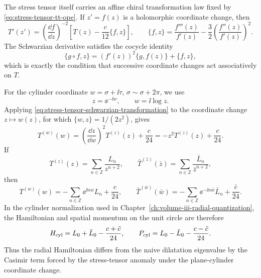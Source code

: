 \begin{proposition}
\label{prop:schwarzian-transformation-plane-cylinder-shift}
The stress tensor itself carries an affine chiral transformation law fixed by
\eqref{eq:stress-tensor-tt-ope}.  If \(z'=f(z)\) is a holomorphic coordinate
change, then
\begin{equation}
  T'(z')
  =
  \left(\frac{\dd f}{\dd z}\right)^{-2}
  \left[
    T(z)-\frac{c}{12}\{f,z\}
  \right],
  \qquad
  \{f,z\}
  =
  \frac{f'''(z)}{f'(z)}
  -
  \frac32
  \left(\frac{f''(z)}{f'(z)}\right)^2 .
  \label{eq:stress-tensor-schwarzian-transformation}
\end{equation}
The Schwarzian derivative satisfies the cocycle identity
\[
  \{g\circ f,z\}
  =
  (f'(z))^2\{g,f(z)\}+\{f,z\},
\]
which is exactly the condition that successive coordinate changes act
associatively on \(T\).

For the cylinder coordinate \(w=\sigma+\ii\tau\), \(\sigma\sim\sigma+2\pi\),
we use
\[
  z=\ee^{-\ii w},
  \qquad
  w=\ii\log z.
\]
Applying \eqref{eq:stress-tensor-schwarzian-transformation} to the coordinate
change \(z\mapsto w(z)\), for which \(\{w,z\}=1/(2z^2)\), gives
\begin{equation}
  T^{(w)}(w)
  =
  \left(\frac{\dd z}{\dd w}\right)^2T^{(z)}(z)
  +
  \frac{c}{24}
  =
  -z^2T^{(z)}(z)+\frac{c}{24}.
  \label{eq:plane-cylinder-stress-tensor-shift}
\end{equation}
If
\[
  T^{(z)}(z)=\sum_{n\in\mathbb Z}\frac{L_n}{z^{n+2}},
  \qquad
  \bar T^{(\bar z)}(\bar z)=
  \sum_{n\in\mathbb Z}\frac{\bar L_n}{\bar z^{n+2}},
\]
then
\[
  T^{(w)}(w)
  =
  -\sum_{n\in\mathbb Z}\ee^{\ii n w}L_n+\frac{c}{24},
  \qquad
  \bar T^{(\bar w)}(\bar w)
  =
  -\sum_{n\in\mathbb Z}\ee^{-\ii n\bar w}\bar L_n
  +\frac{\bar c}{24}.
\]
In the cylinder normalization used in
Chapter~\ref{ch:volume-iii-radial-quantization}, the Hamiltonian and spatial
momentum on the unit circle are therefore
\begin{equation}
  H_{\rm cyl}
  =
  L_0+\bar L_0-\frac{c+\bar c}{24},
  \qquad
  P_{\rm cyl}
  =
  L_0-\bar L_0-\frac{c-\bar c}{24}.
  \label{eq:cylinder-hamiltonian-momentum-virasoro}
\end{equation}
Thus the radial Hamiltonian differs from the naive dilatation eigenvalue by
the Casimir term forced by the stress-tensor anomaly under the plane-cylinder
coordinate change.
\end{proposition}

